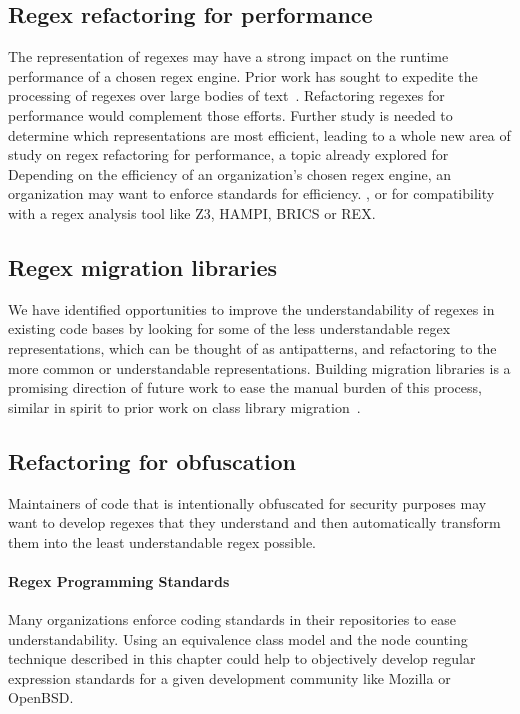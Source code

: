 \subsection{Regex refactoring for performance}
The representation of regexes may have a strong impact on the runtime performance of a chosen regex engine. Prior work has sought to expedite the processing of regexes over large bodies of text~\cite{Baeza-Yates:1996:FTS:235809.235810}.
Refactoring regexes for performance would complement those efforts.
Further study is needed to determine which representations are most efficient, leading to a whole new area of study on regex refactoring for performance, a topic already explored for
Depending on the efficiency of an organization's chosen regex engine, an organization may want to enforce standards for efficiency.
, or for compatibility with a regex analysis tool like Z3, HAMPI, BRICS or REX.

\subsection{Regex migration libraries}
We have identified opportunities
to improve the understandability of regexes in existing code bases by looking for some of the less understandable regex representations, which can be thought of as antipatterns, and refactoring to the more common or understandable representations.
Building migration libraries is a promising direction of future work to ease the manual burden of this process, similar in spirit to prior work on class library migration~\cite{Balaban:2005:RSC:1103845.1094832}.

\subsection{Refactoring for obfuscation}
Maintainers of code that is intentionally obfuscated for security purposes may want to develop regexes that they understand and then automatically transform them into the least understandable regex possible.

\paragraph{Regex Programming Standards}
Many organizations enforce coding standards in their repositories to ease understandability.  Using an equivalence class model and the node counting technique described in this chapter could help to objectively develop regular expression standards for a given development community like Mozilla or OpenBSD.
